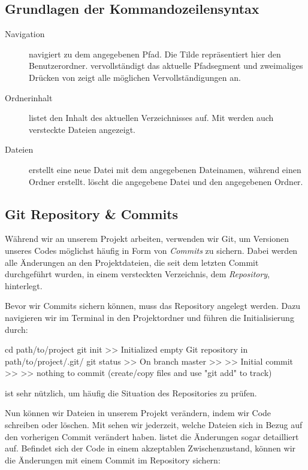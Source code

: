 \documentclass[parskip=half, final]{scrreprt}
\begin{document}
\subsection{Grundlagen der Kommandozeilensyntax}
\begin{description}
\item[Navigation]  navigiert zu dem angegebenen Pfad. Die Tilde \shinline{~} repräsentiert hier den Benutzerordner. \keys{\tab} vervollständigt das aktuelle Pfadsegment und zweimaliges Drücken von \keys{\tab} zeigt alle möglichen Vervollständigungen an.
\item[Ordnerinhalt]  listet den Inhalt des aktuellen Verzeichnisses auf. Mit  werden auch versteckte Dateien angezeigt.
\item[Dateien]  erstellt eine neue Datei mit dem angegebenen Dateinamen, während  einen Ordner erstellt.  löscht die angegebene Datei und  den angegebenen Ordner.
\end{description}

\subsection{Git Repository \& Commits}
 
Während wir an unserem Projekt arbeiten, verwenden wir Git, um Versionen unseres Codes möglichst häufig in Form von \emph{Commits} zu sichern. Dabei werden alle Änderungen an den Projektdateien, die seit dem letzten Commit durchgeführt wurden, in einem versteckten  Verzeichnis, dem \emph{Repository}, hinterlegt.

Bevor wir Commits sichern können, muss das Repository angelegt werden. Dazu navigieren wir im Terminal in den Projektordner und führen die Initialisierung durch:

\begin{shcode}
cd path/to/project
git init
>> Initialized empty Git repository in path/to/project/.git/
git status
>> On branch master
>> 
>> Initial commit
>> 
>> nothing to commit (create/copy files and use "git add" to track)
\end{shcode}

 ist sehr nützlich, um häufig die Situation des Repositories zu prüfen.

Nun können wir Dateien in unserem Projekt verändern, indem wir Code schreiben oder löschen. Mit  sehen wir jederzeit, welche Dateien sich in Bezug auf den vorherigen Commit verändert haben.  listet die Änderungen sogar detailliert auf. Befindet sich der Code in einem akzeptablen Zwischenzustand, können wir die Änderungen mit einem Commit im Repository sichern:
\end{document}
